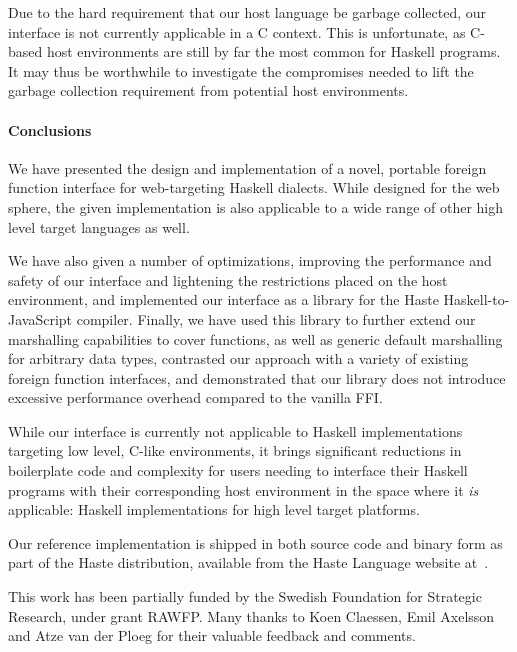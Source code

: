 \documentclass[preprint]{sigplanconf}
\begin{document}
Due to the hard requirement that our host language be garbage collected,
our interface is not currently applicable in a C context. This is unfortunate,
as C-based host environments are still by far the most common for Haskell
programs. It may thus be worthwhile to investigate the compromises needed
to lift the garbage collection requirement from potential host environments.

\paragraph{Conclusions}
We have presented the design and implementation of a novel, portable foreign
function interface for web-targeting Haskell dialects. While designed for the
web sphere, the given implementation is also applicable to a wide range of
other high level target languages as well.

We have also given a number of optimizations, improving the performance and
safety of our interface
and lightening the restrictions placed on the host environment, and implemented
our interface as a library for the Haste Haskell-to-JavaScript compiler.
Finally, we have used this library to further extend our marshalling
capabilities to cover functions, as well as generic default marshalling for
arbitrary data types, contrasted our approach with a variety of existing
foreign function interfaces, and demonstrated that our library does not
introduce excessive performance overhead compared to the vanilla FFI.

While our interface is currently not applicable to Haskell implementations
targeting low level, C-like environments, it brings significant reductions in
boilerplate code and complexity for users needing to interface their Haskell
programs with their corresponding host environment in the space where it
\emph{is} applicable: Haskell implementations for high level target platforms.

Our reference implementation is shipped in both source code and binary form as
part of the Haste distribution, available from the Haste Language website
at\ \cite{haste-lang.org}.

\acks
This work has been partially funded by the Swedish Foundation for Strategic Research, under grant RAWFP. Many thanks to Koen Claessen, Emil Axelsson and Atze van der Ploeg for their valuable feedback and comments.



\end{document}
